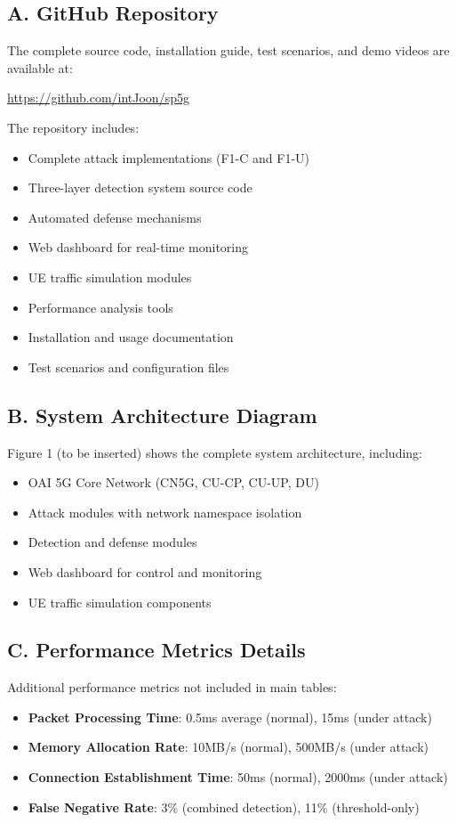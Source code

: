 \documentclass[conference]{IEEEtran}
\begin{document}
\subsection*{A. GitHub Repository}

The complete source code, installation guide, test scenarios, and demo videos are available at:

\url{https://github.com/intJoon/sp5g}

The repository includes:
\begin{itemize}
    \item Complete attack implementations (F1-C and F1-U)
    \item Three-layer detection system source code
    \item Automated defense mechanisms
    \item Web dashboard for real-time monitoring
    \item UE traffic simulation modules
    \item Performance analysis tools
    \item Installation and usage documentation
    \item Test scenarios and configuration files
\end{itemize}

\subsection*{B. System Architecture Diagram}

Figure 1 (to be inserted) shows the complete system architecture, including:
\begin{itemize}
    \item OAI 5G Core Network (CN5G, CU-CP, CU-UP, DU)
    \item Attack modules with network namespace isolation
    \item Detection and defense modules
    \item Web dashboard for control and monitoring
    \item UE traffic simulation components
\end{itemize}

\subsection*{C. Performance Metrics Details}

Additional performance metrics not included in main tables:
\begin{itemize}
    \item \textbf{Packet Processing Time}: 0.5ms average (normal), 15ms (under attack)
    \item \textbf{Memory Allocation Rate}: 10MB/s (normal), 500MB/s (under attack)
    \item \textbf{Connection Establishment Time}: 50ms (normal), 2000ms (under attack)
    \item \textbf{False Negative Rate}: 3\% (combined detection), 11\% (threshold-only)
\end{itemize}
\end{document}
